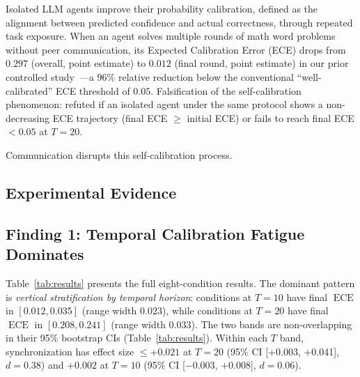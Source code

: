 \documentclass[11pt]{article}
\DeclareMathOperator{\ECE}{ECE}
\begin{document}
Isolated LLM agents improve their probability calibration, defined as the alignment between predicted confidence and actual correctness, through repeated task exposure. When an agent solves multiple rounds of math word problems without peer communication, its Expected Calibration Error (ECE) drops from $0.297$ (overall, point estimate) to $0.012$ (final round, point estimate) in our prior controlled study~\cite{liu2026calibration}---a $96\%$ relative reduction below the conventional ``well-calibrated'' ECE threshold of $0.05$. Falsification of the self-calibration phenomenon: refuted if an isolated agent under the same protocol shows a non-decreasing ECE trajectory (final ECE $\geq$ initial ECE) or fails to reach final ECE $< 0.05$ at $T = 20$.

Communication disrupts this self-calibration process.

\subsection{Experimental Evidence}

\subsection{Finding 1: Temporal Calibration Fatigue Dominates}

Table~\ref{tab:results} presents the full eight-condition results. The dominant pattern is \textit{vertical stratification by temporal horizon}: conditions at $T{=}10$ have final $\ECE$ in $[0.012, 0.035]$ (range width $0.023$), while conditions at $T{=}20$ have final $\ECE$ in $[0.208, 0.241]$ (range width $0.033$). The two bands are non-overlapping in their 95\% bootstrap CIs (Table~\ref{tab:results}). Within each $T$ band, synchronization has effect size $\leq +0.021$ at $T{=}20$ (95\% CI [+0.003, +0.041], $d = 0.38$) and $+0.002$ at $T{=}10$ (95\% CI [$-0.003$, $+0.008$], $d = 0.06$).
\end{document}
